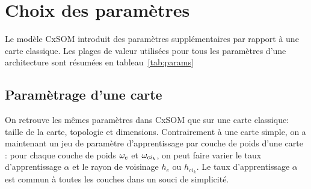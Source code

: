 \documentclass[../main]{subfiles}
\begin{document}


\section{Choix des paramètres}\label{sec:params}

Le modèle CxSOM introduit des paramètres supplémentaires par rapport à une carte classique. Les plages de valeur utilisées pour tous les paramètres d'une architecture sont résumées en tableau~\ref{tab:params}
\subsection{Paramètrage d'une carte}
On retrouve les mêmes paramètres dans CxSOM que sur une carte classique: taille de la carte, topologie et dimensions. 
Contrairement à une carte simple, on a maintenant un jeu de paramètre d'apprentissage par couche de poids d'une carte : pour chaque couche de poids $\omega_e$ et $\omega_{ci_k}$, on peut faire varier le taux d'apprentissage $\alpha$ et le rayon de voisinage $h_e$ ou $h_{ci_k}$. Le taux d'apprentissage $\alpha$ est commun à toutes les couches dans un souci de simplicité.
\end{document}
